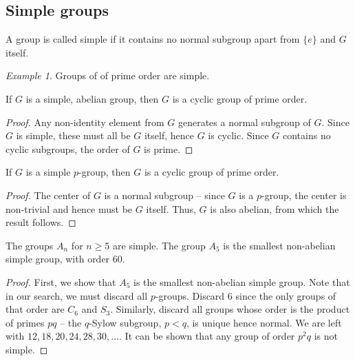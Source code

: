 \documentclass[11pt]{article}
\theoremstyle{definition}
\theoremstyle{remark}
\newtheorem*{example}{Example}
\numberwithin{equation}{section}
\begin{document}
    \subsection{Simple groups}
    
    \begin{definition}
        A group is called simple if it contains no normal subgroup apart from $\{e\}$
        and $G$ itself.
    \end{definition}
    \begin{example}
        Groups of of prime order are simple.
    \end{example}
    
    \begin{lemma}
        If $G$ is a simple, abelian group, then $G$ is a cyclic group of prime order.
    \end{lemma}
    \begin{proof}
        Any non-identity element from $G$ generates a normal subgroup of $G$. Since
        $G$ is simple, these must all be $G$ itself, hence $G$ is cyclic. Since $G$
        contains no cyclic subgroups, the order of $G$ is prime.
    \end{proof}

    \begin{lemma}
        If $G$ is a simple $p$-group, then $G$ is a cyclic group of prime order.
    \end{lemma}
    \begin{proof}
        The center of $G$ is a normal subgroup -- since $G$ is a $p$-group, the
        center is non-trivial and hence must be $G$ itself. Thus, $G$ is also
        abelian, from which the result follows.
    \end{proof}

    \begin{theorem}
        The groups $A_n$ for $n \geq 5$ are simple. The group $A_5$ is the smallest
        non-abelian simple group, with order $60$.
    \end{theorem}
    \begin{proof}
        First, we show that $A_5$ is the smallest non-abelian simple group. Note that
        in our search, we must discard all $p$-groups. Discard $6$ since the only
        groups of that order are $C_6$ and $S_3$. Similarly, discard all groups whose
        order is the product of primes $pq$ -- the $q$-Sylow subgroup, $p < q$, is
        unique hence normal. We are left with $12, 18, 20, 24, 28, 30, \dots$. It can
        be shown that any group of order $p^2q$ is not simple.
    \end{proof}
\end{document}

